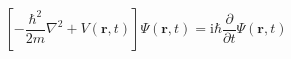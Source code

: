 \documentclass[varwidth, margin=4pt]{standalone}
\begin{document}
\[
    \left[ -\frac{\hbar^2}{2m} \nabla^2 + V(\mathbf{r}, t) \right]
    \Psi(\mathbf{r}, t)
  = \mathrm{i} \hbar \frac{\partial}{\partial t} \Psi(\mathbf{r}, t)
\]
\end{document}
